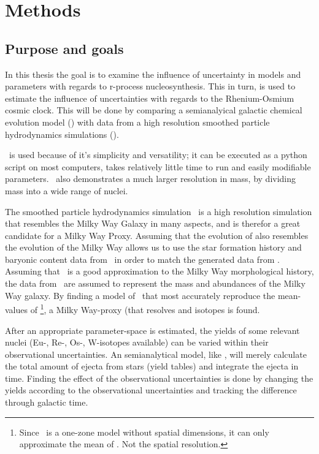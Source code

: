 \chapter{Methods}
\label{sec:methods}

\section{Purpose and goals}
In this thesis the goal is to examine the influence of uncertainty in models and parameters with regards to r-process nucleosynthesis.
This in turn, is used to estimate the influence of uncertainties with regards to the Rhenium-Osmium cosmic clock.
This will be done by comparing a semianalyical galactic chemical evolution model (\omegamodel) with data from a high resolution smoothed particle hydrodynamics simulations (\eris).

\omegamodel\ is used because of it's simplicity and versatility;
it can be executed as a python script on most computers, takes relatively little time to run and easily modifiable parameters.
\omegamodel\ also demonstrates a much larger resolution in mass, by dividing mass into a wide range of nuclei.

The smoothed particle hydrodynamics simulation \eris\ is a high resolution simulation that resembles the Milky Way Galaxy in many aspects, and is therefor a great candidate for a Milky Way Proxy.
Assuming that the evolution of \eris also resembles the evolution of the Milky Way allows us to use the star formation history and baryonic content data from \eris\ in order to match the generated data from \omegamodel.
Assuming that \eris\ is a good approximation to the Milky Way morphological history, the data from \eris\ are assumed to represent the mass and abundances of the Milky Way galaxy.
By finding a model of \omegamodel\ that most accurately reproduce the mean-values of \eris\footnote{Since \omegamodel\ is a one-zone model without spatial dimensions, it can only approximate the mean of \eris. Not the spatial resolution.}, a Milky Way-proxy (that resolves  and  isotopes is found.

After an appropriate parameter-space is estimated, the yields of some relevant nuclei (Eu-, Re-, Os-, W-isotopes available) can be varied within their observational uncertainties.
An semianalytical model, like \omegamodel, will merely calculate the total amount of ejecta from stars (yield tables) and integrate the ejecta in time.
Finding the effect of the observational uncertainties is done by changing the yields according to the observational uncertainties and tracking the difference through galactic time.

